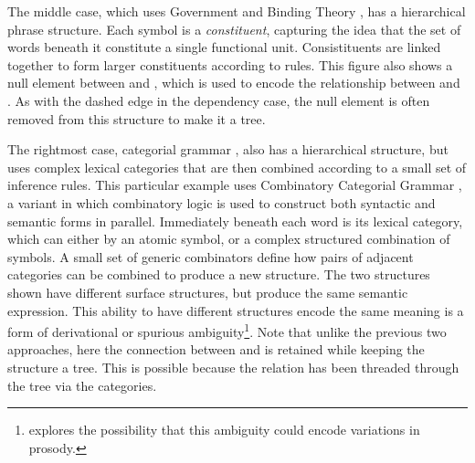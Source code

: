 The middle case, which uses Government and Binding Theory \parencite[\gb][]{gb}, has a hierarchical phrase structure.
Each symbol is a \textit{constituent}, capturing the idea that the set of words beneath it constitute a single functional unit.
Consistituents are linked together to form larger constituents according to rules.
This figure also shows a null element between  and , which is used to encode the relationship between  and .
As with the dashed edge in the dependency case, the null element is often removed from this structure to make it a tree.

The rightmost case, categorial grammar \parencite{categorial-grammar}, also has a hierarchical structure, but uses complex lexical categories that are then combined according to a small set of inference rules.
This particular example uses Combinatory Categorial Grammar \parencite[\ccg][]{Steedman:2000}, a variant in which combinatory logic is used to construct both syntactic and semantic forms in parallel.
Immediately beneath each word is its lexical category, which can either by an atomic symbol, or a complex structured combination of symbols.
A small set of generic combinators define how pairs of adjacent categories can be combined to produce a new structure.
The two structures shown have different surface structures, but produce the same semantic expression.
This ability to have different structures encode the same meaning is a form of derivational or spurious ambiguity\footnote{\textcite{Steedman:2000} explores the possibility that this ambiguity could encode variations in prosody.}.
Note that unlike the previous two approaches, here the connection between  and  is retained while keeping the structure a tree.
This is possible because the relation has been threaded through the tree via the categories.


